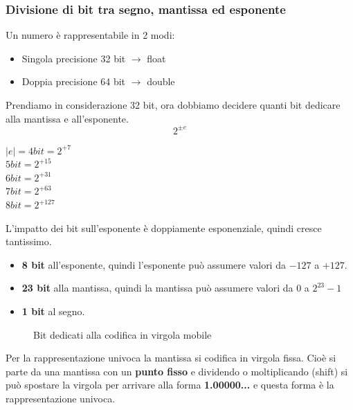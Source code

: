 \documentclass[a4paper]{article}
\theoremstyle{break}
\theoremstyle{break}
\theoremstyle{break}
\theoremstyle{break}
\begin{document}
\subsubsection{Divisione di bit tra segno, mantissa ed esponente}
Un numero è rappresentabile in 2 modi:
\begin{itemize}
	\item Singola precisione 32 bit \( \to  \) float
	\item Doppia precisione 64 bit \( \to  \) double
\end{itemize}

Prendiamo in considerazione 32 bit, ora dobbiamo decidere quanti bit dedicare
alla mantissa e all'esponente.
\[
	2^{\pm e}
\]
\begin{center}
	$|e| = 4 bit = 2^{+7}$\\
	$5 bit = 2^{+15}$\\
	$6 bit = 2^{+31}$\\
	$7 bit = 2^{+63}$\\
	$8 bit = 2^{+127}$
\end{center}
L'impatto dei bit sull'esponente è doppiamente esponenziale, quindi cresce tantissimo.

\begin{itemize}
	\item \textbf{8 bit} all'esponente, quindi l'esponente
	      può assumere valori da \( -127 \) a \( +127 \).
	\item \textbf{23 bit} alla mantissa, quindi la mantissa
	      può assumere valori da \( 0 \) a \( 2^{23}-1 \)
	\item \textbf{1 bit} al segno.
\end{itemize}

\begin{figure}[H]
    \begin{center}
    \end{center}
    \caption{Bit dedicati alla codifica in virgola mobile}
\end{figure}
Per la rappresentazione univoca la mantissa si codifica in virgola fissa.
Cioè si parte da una mantissa con un \textbf{punto fisso} e dividendo o moltiplicando (shift) si
può spostare la virgola per arrivare alla forma \textbf{1.00000...} e questa forma è la
rappresentazione univoca.
\end{document}
